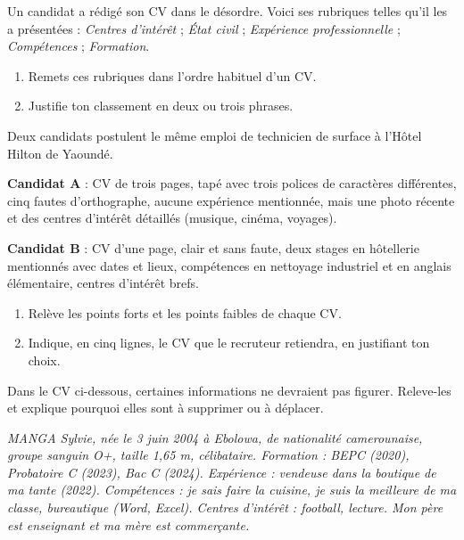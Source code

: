 \documentclass[11pt]{article}
\begin{document}
\begin{exercice}
Un candidat a rédigé son CV dans le désordre. Voici ses rubriques telles qu'il les a présentées : \emph{Centres d'intérêt} ; \emph{État civil} ; \emph{Expérience professionnelle} ; \emph{Compétences} ; \emph{Formation}.
\begin{enumerate}
\item Remets ces rubriques dans l'ordre habituel d'un CV.
\item Justifie ton classement en deux ou trois phrases.
\end{enumerate}
\end{exercice}

\begin{exercice}
Deux candidats postulent le même emploi de technicien de surface à l'Hôtel Hilton de Yaoundé.

\textbf{Candidat A} : CV de trois pages, tapé avec trois polices de caractères différentes, cinq fautes d'orthographe, aucune expérience mentionnée, mais une photo récente et des centres d'intérêt détaillés (musique, cinéma, voyages).

\textbf{Candidat B} : CV d'une page, clair et sans faute, deux stages en hôtellerie mentionnés avec dates et lieux, compétences en nettoyage industriel et en anglais élémentaire, centres d'intérêt brefs.

\begin{enumerate}
\item Relève les points forts et les points faibles de chaque CV.
\item Indique, en cinq lignes, le CV que le recruteur retiendra, en justifiant ton choix.
\end{enumerate}
\end{exercice}

\begin{exercice}
Dans le CV ci-dessous, certaines informations ne devraient pas figurer. Releve-les et explique pourquoi elles sont à supprimer ou à déplacer.

\emph{MANGA Sylvie, née le 3 juin 2004 à Ebolowa, de nationalité camerounaise, groupe sanguin O+, taille 1,65 m, célibataire. Formation : BEPC (2020), Probatoire C (2023), Bac C (2024). Expérience : vendeuse dans la boutique de ma tante (2022). Compétences : je sais faire la cuisine, je suis la meilleure de ma classe, bureautique (Word, Excel). Centres d'intérêt : football, lecture. Mon père est enseignant et ma mère est commerçante.}
\end{exercice}
\end{document}
